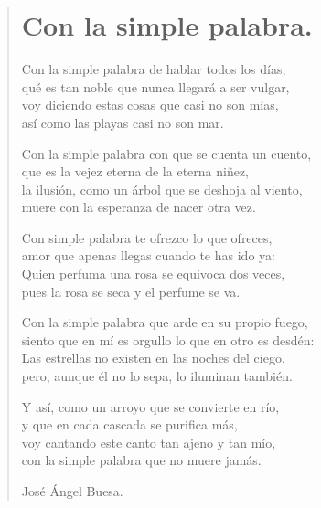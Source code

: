 \documentclass[11pt, portrait, twoside, notitlepage, openright]{book}
\begin{document}
\newpage
\begin{verse}
\begin{center}
\section{Con la simple palabra.}
\end{center}
Con la simple palabra de hablar todos los días,\\
qué es tan noble que nunca llegará a ser vulgar,\\
voy diciendo estas cosas que casi no son mías,\\
así como las playas casi no son mar.
\newline

Con la simple palabra con que se cuenta un cuento,\\
que es la vejez eterna de la eterna niñez,\\
la ilusión, como un árbol que se deshoja al viento,\\
muere con la esperanza de nacer otra vez.
\newline

Con simple palabra te ofrezco lo que ofreces,\\
amor que apenas llegas cuando te has ido ya:\\
Quien perfuma una rosa se equivoca dos veces,\\
pues la rosa se seca y el perfume se va.
\newline

Con la simple palabra que arde en su propio fuego,\\
siento que en mí es orgullo lo que en otro es desdén:\\
Las estrellas no existen en las noches del ciego,\\
pero, aunque él no lo sepa, lo iluminan también.
\newpage

Y así, como un arroyo que se convierte en río,\\
y que en cada cascada se purifica más,\\
voy cantando este canto tan ajeno y tan mío,\\
con la simple palabra que no muere jamás.
\newline

José Ángel Buesa.
\end{verse}
\end{document}
